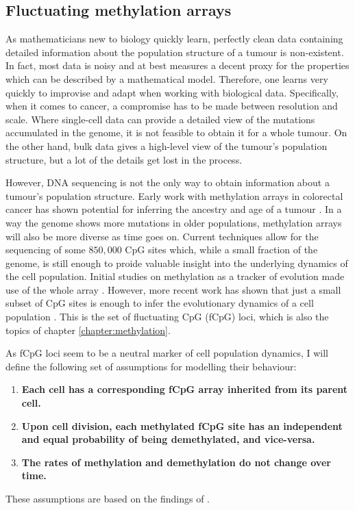 \subsection{Fluctuating methylation arrays}
As mathematicians new to biology quickly learn, perfectly clean data containing
detailed information about the population structure of a tumour is
non-existent. In fact, most data is noisy and at best measures a decent proxy
for the properties which can be described by a mathematical model. Therefore,
one learns very quickly to improvise and adapt when working with biological
data. Specifically, when it comes to cancer, a compromise has to be made
between resolution and scale. Where single-cell data can provide a detailed
view of the mutations accumulated in the genome, it is not feasible to obtain
it for a whole tumour. On the other hand, bulk data gives a high-level view of
the tumour's population structure, but a lot of the details get lost in the
process. \par
However, DNA sequencing is not the only way to obtain information about a
tumour's population structure. Early work with methylation arrays in colorectal
cancer has shown potential for inferring the ancestry and age of a tumour
\cite{hong_using_2010, siegmund_high_2011}. In a way the genome shows more
mutations in older populations, methylation arrays will also be more diverse as
time goes on. Current techniques allow for the sequencing of some $850,000$ CpG
sites which, while a small fraction of the genome, is still enough to proide
valuable insight into the underlying dynamics of the cell population. Initial
studies on methylation as a tracker of evolution made use of the whole array
\cite{siegmund_modeling_2008, sottoriva_integrating_2010}. However, more recent
work has shown that just a small subset of CpG sites is enough to infer the
evolutionary dynamics of a cell population \cite{gabbutt_fluctuating_2022,
gabbutt_evolutionary_2023}. This is the set of fluctuating CpG (fCpG) loci,
which is also the topics of chapter \ref{chapter:methylation}. \par
As fCpG loci seem to be a neutral marker of cell population dynamics, I will
define the following set of assumptions for modelling their behaviour:
\begin{enumerate}[(i')]
    \item \textbf{Each cell has a corresponding fCpG array inherited from its
        parent cell.}
    \item \textbf{Upon cell division, each methylated fCpG site has an
        independent and equal probability of being demethylated, and
        vice-versa.}
    \item \textbf{The rates of methylation and demethylation do not change over
        time.}
\end{enumerate}
These assumptions are based on the findings of \cite{gabbutt_fluctuating_2022,
gabbutt_evolutionary_2023}.

